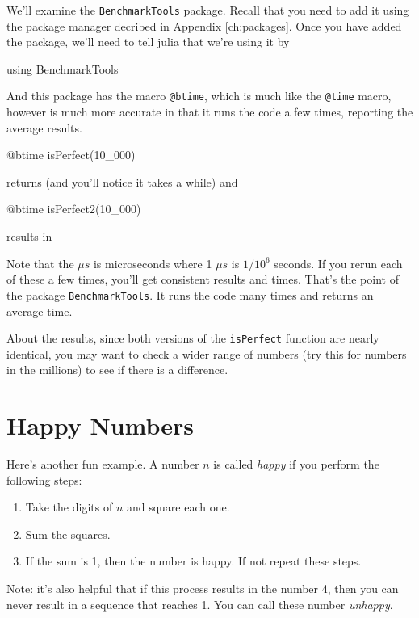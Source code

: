 We'll examine the \texttt{BenchmarkTools} package.  Recall that you need to add it using the package manager decribed in Appendix \ref{ch:packages}.  Once you have added the package, we'll need to tell julia that we're using it by
\begin{jlblock}[nt]
using BenchmarkTools
\end{jlblock}

And this package has the macro \verb!@btime!, which is much like the \verb!@time! macro, however is much more accurate in that it runs the code a few times, reporting the average results.  

\begin{jlblock}[nt]
@btime isPerfect(10_000)
\end{jlblock}
%
returns (and you'll notice it takes a while)  \printpythontex[verbatim]
%
and
\begin{jlblock}[nt]
@btime isPerfect2(10_000)
\end{jlblock}
results in  \printpythontex[verbatim]

Note that the $\mu s$ is microseconds where 1 $\mu s$ is $1/10^6$ seconds.  If you rerun each of these a few times, you'll get consistent results and times.  That's the point of the package \texttt{BenchmarkTools}.  It runs the code many times and returns an average time.  

About the results, since both versions of the \texttt{isPerfect} function are nearly identical, you may want to check a wider range of numbers (try this for numbers in the millions) to see if there is a difference.  


\section{Happy Numbers}

Here's another fun example. A number $n$ is called \emph{happy} if you perform the following steps:
\begin{enumerate}
\item Take the digits of $n$ and square each one.
\item Sum the squares.
\item If the sum is 1, then the number is happy.  If not repeat these steps. 
\end{enumerate}

Note: it's also helpful that if this process results in the number 4,
then you can never result in a sequence that reaches 1. You can call
these number \emph{unhappy}.  


